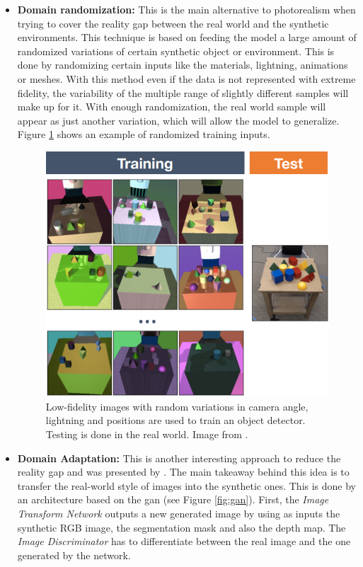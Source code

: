 \begin{itemize}
	\item \textbf{Domain randomization:} This is the main alternative to photorealism \citep{DBLP:journals/corr/TobinFRSZA17} when trying to cover the reality gap between the real world and the synthetic environments. This technique is based on feeding the model a large amount of randomized variations of certain synthetic object or environment. This is done by randomizing certain inputs like the materials, lightning, animations or meshes. With this method even if the data is not represented with extreme fidelity, the variability of the multiple range of slightly different samples will make up for it. With enough randomization, the real world sample will appear as just another variation, which will allow the model to generalize. Figure \ref{fig:domainrandomization} shows an example of randomized training inputs.
	
	\begin{figure}
		\centering
		\includegraphics[width=0.5\linewidth]{archivos/domain_randomization}
		\caption{Low-fidelity images with random variations in camera angle, lightning and positions are used to train an object detector. Testing is done in the real world. Image from \cite{DBLP:journals/corr/TobinFRSZA17}.}
		\label{fig:domainrandomization}
	\end{figure}
	
	\item \textbf{Domain Adaptation:} This is another interesting approach to reduce the reality gap and was presented by \cite{DBLP:journals/corr/abs-1812-05040}. The main takeaway behind this idea is to transfer the real-world style of images into the synthetic ones. This is done by an architecture based on the \gls{gan} (see Figure \ref{fig:gan}). First, the \textit{Image Transform Network} outputs a new generated image by using as inputs the synthetic RGB image, the segmentation mask and also the depth map. The \textit{Image Discriminator} has to differentiate between the real image and the one generated by the network. 
	

\end{itemize}
